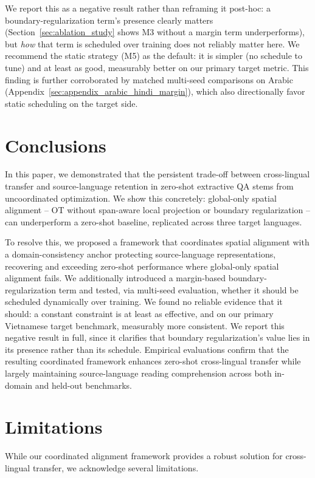 \documentclass[11pt]{article}
\begin{document}
We report this as a negative result rather than reframing it post-hoc: a boundary-regularization term's presence clearly matters (Section~\ref{sec:ablation_study} shows M3 without a margin term underperforms), but \emph{how} that term is scheduled over training does not reliably matter here. We recommend the static strategy (M5) as the default: it is simpler (no schedule to tune) and at least as good, measurably better on our primary target metric. This finding is further corroborated by matched multi-seed comparisons on Arabic (Appendix~\ref{sec:appendix_arabic_hindi_margin}), which also directionally favor static scheduling on the target side.

\section{Conclusions}
In this paper, we demonstrated that the persistent trade-off between cross-lingual transfer and source-language retention in zero-shot extractive QA stems from uncoordinated optimization. We show this concretely: global-only spatial alignment -- OT without span-aware local projection or boundary regularization -- can underperform a zero-shot baseline, replicated across three target languages.

To resolve this, we proposed a framework that coordinates spatial alignment with a domain-consistency anchor protecting source-language representations, recovering and exceeding zero-shot performance where global-only spatial alignment fails. We additionally introduced a margin-based boundary-regularization term and tested, via multi-seed evaluation, whether it should be scheduled dynamically over training. We found no reliable evidence that it should: a constant constraint is at least as effective, and on our primary Vietnamese target benchmark, measurably more consistent. We report this negative result in full, since it clarifies that boundary
regularization's value lies in its presence rather than its schedule. Empirical evaluations confirm that the resulting coordinated framework enhances zero-shot cross-lingual transfer while largely maintaining source-language reading comprehension across both in-domain and held-out benchmarks.

\section*{Limitations}
While our coordinated alignment framework provides a robust solution for cross-lingual transfer, we acknowledge several limitations.
\end{document}
